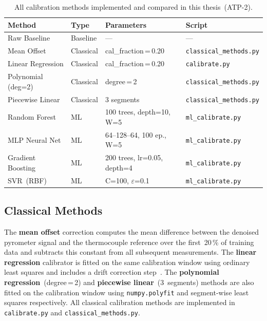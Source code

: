 \begin{table}[H]
\centering
\caption{All calibration methods implemented and compared in this thesis~(ATP-2).}
\label{tab:calibration_methods}
\begin{tabular}{llll}
\toprule
\textbf{Method} & \textbf{Type} & \textbf{Parameters} & \textbf{Script} \\
\midrule
Raw Baseline        & Baseline  & ---                              & --- \\
Mean Offset         & Classical & cal\_fraction\,=\,0.20           & \texttt{classical\_methods.py} \\
Linear Regression   & Classical & cal\_fraction\,=\,0.20           & \texttt{calibrate.py} \\
Polynomial (deg=2)  & Classical & degree\,=\,2                     & \texttt{classical\_methods.py} \\
Piecewise Linear    & Classical & 3 segments                       & \texttt{classical\_methods.py} \\
Random Forest       & ML        & 100 trees, depth=10, W=5         & \texttt{ml\_calibrate.py} \\
MLP Neural Net      & ML        & 64--128--64, 100 ep., W=5        & \texttt{ml\_calibrate.py} \\
Gradient Boosting   & ML        & 200 trees, lr=0.05, depth=4      & \texttt{ml\_calibrate.py} \\
SVR~(RBF)           & ML        & C=100, $\varepsilon$=0.1         & \texttt{ml\_calibrate.py} \\
\bottomrule
\end{tabular}
\end{table}

\subsection{Classical Methods}

The \textbf{mean offset} correction computes the mean difference between the denoised pyrometer signal and the thermocouple reference over the first~20\,\% of training data and subtracts this constant from all subsequent measurements. The \textbf{linear regression} calibrator is fitted on the same calibration window using ordinary least squares and includes a drift correction step~\cite{online_pyrometry_calibration}. The \textbf{polynomial regression}~(degree\,=\,2) and \textbf{piecewise linear}~(3~segments) methods are also fitted on the calibration window using \texttt{numpy.polyfit} and segment-wise least squares respectively. All classical calibration methods are implemented in \texttt{calibrate.py} and \texttt{classical\_methods.py}.

